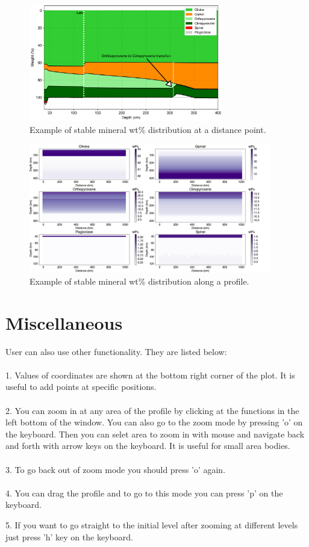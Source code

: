 \documentclass[14pt]{article}
\begin{document}
\begin{figure}
\centering \includegraphics[width=20pc]{./Minerals_1D_ref.png}
\caption{Example of stable mineral wt\% distribution at a distance point.}
\label{1D_mineral}
\end{figure}

\begin{figure}
\centering \includegraphics[width=25pc]{./wt_2D.png}
\caption{Example of stable mineral wt\% distribution along a profile.}
\label{2D_mineral}
\end{figure}


\section{Miscellaneous}
User can also use other functionality. They are listed below:\\
\\
1. Values of coordinates are shown at the bottom right corner of the plot. 	  	It is useful to add points at specific positions.\\
\\
2. You can zoom in at any area of the profile by clicking at the functions 			in the left bottom of the window. You can also go to the zoom mode by 	pressing 'o' on the keyboard. Then you can selet area to zoom in with mouse and navigate back and forth with arrow keys on the keyboard. It is 	useful for small area bodies.\\
\\
3. To go back out of zoom mode you should press 'o'  again.\\
\\
4. You can drag the profile and to go to this mode you can press 'p' on the keyboard.

5. If you want to go straight to the initial level after zooming at different levels just press 'h' key on the keyboard.
\end{document}
